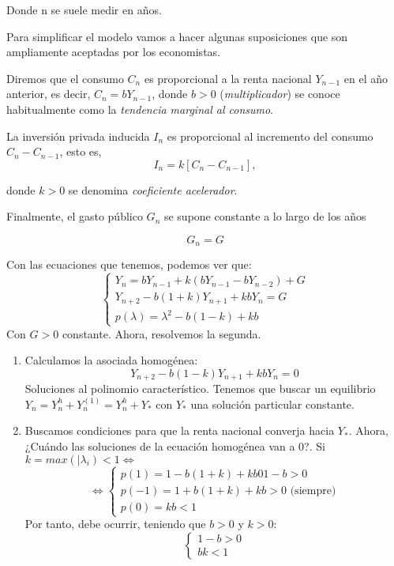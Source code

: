 \documentclass[11pt, a4paper, titlepage]{article}
\theoremstyle{theorem-style}
\theoremstyle{definition-style}
\theoremstyle{remark-style}
\theoremstyle{example-style}
\begin{document}
        Donde n se suele medir en años.

        Para simplificar el modelo vamos a hacer algunas suposiciones que son
        ampliamente aceptadas por los economistas.

        Diremos que el consumo $C_{n}$ es proporcional a la renta nacional
        $Y_{n-1}$ en el año anterior, es decir, $C_{n} = bY_{n-1}$, donde $b >
        0$ (\textit{multiplicador}) se conoce habitualmente como la
        \textit{tendencia marginal al consumo}.

        La inversión privada inducida $I_{n}$ es proporcional al incremento del
        consumo $C_{n} - C_{n-1}$, esto es,
        $$I_{n} = k[C_{n} - C_{n-1}],$$

        donde $k > 0$ se denomina \textit{coeficiente acelerador}.

        Finalmente, el gasto público $G_{n}$ se supone constante a lo largo de
        los años

        $$ G_{n} = G $$

Con las ecuaciones que tenemos, podemos ver que:
\[
\begin{cases}
	Y_n  = bY _{n-1} + k(b Y _{n-1} - b Y _{n-2}) + G\\
	Y _{n+2} - b(1+k)Y _{n+1} + kb Y_n = G\\
	p(\lambda) = \lambda^2 - b(1-k) +kb
\end{cases}
\]
Con $G > 0 $ constante. Ahora, resolvemos la segunda.
\begin{enumerate}
	\item Calculamos la asociada homogénea:
	 \[
	 Y _{n+2} - b(1-k)Y _{n+1} + kb Y_n = 0
	 \]
	 Soluciones al polinomio característico. Tenemos que buscar un equilibrio $Y_n = Y_n^h + Y_n^{(1)} = Y_n^h + Y_*$ con $Y_*$ una solución particular constante. 
	 \item Buscamos condiciones para que la renta nacional converja hacia $Y_*$. Ahora, ¿Cuándo las soluciones de la ecuación homogénea van a 0?. Si $k = max (|\lambda_i) < 1 \iff$
	 \[
	 \iff \begin{cases}
	p(1) = 1-b(1+k) +kb 0 1-b > 0\\
	p(-1) = 1+b(1+k) +kb > 0 \text{ (siempre)}\\
	p(0) = kb < 1
\end{cases}
	 \]
	 Por tanto, debe ocurrir, teniendo que $b> 0 $ y $k > 0$:
	 \[
	 \begin{cases}
	1-b > 0\\
	bk < 1
\end{cases}
	 \]
	 
\end{enumerate}
\end{document}
